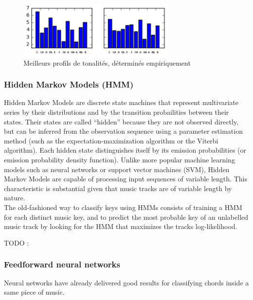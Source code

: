 \documentclass[letterpaper]{article}
\begin{document}
\begin{figure}
\begin{center}
\includegraphics[width=3.1in,angle=0]{imgs/Custom.png}
\caption{Meilleurs profils de tonalités, déterminés empiriquement}
\label{fig1}
\end{center}
\end{figure}

\subsubsection{Hidden Markov Models (HMM)}
\label{sssec:hmm}

Hidden Markov Models are discrete state machines that represent multivariate series by their distributions and by
the transition probailities between their states. Their states are called “hidden” because they are not observed directly,
but can be inferred from the observation sequence using a parameter estimation method (such as the expectation-maximization algorithm
or the Viterbi algorithm). Each hidden state distinguishes itself by its emission probabilities (or emission probability density function).
Unlike more popular machine learning models such as neural networks or support vector machines (SVM), Hidden Markov Models are capable of
processing input sequences of variable length. This characteristic is substantial given that music tracks are of variable length by nature.\\

The old-fashioned way to classify keys using HMMs consists of training a HMM for each distinct music key, and to predict the most probable 
key of an unlabelled music track by looking for the HMM that maximizes the track\textquotesingle s log-likelihood.

TODO : \citep{JP} \citep{DR}

\subsubsection{Feedforward neural networks}

Neural networks have already delivered good results for classifying chords inside a same piece of music. \citep{JO}
\end{document}

